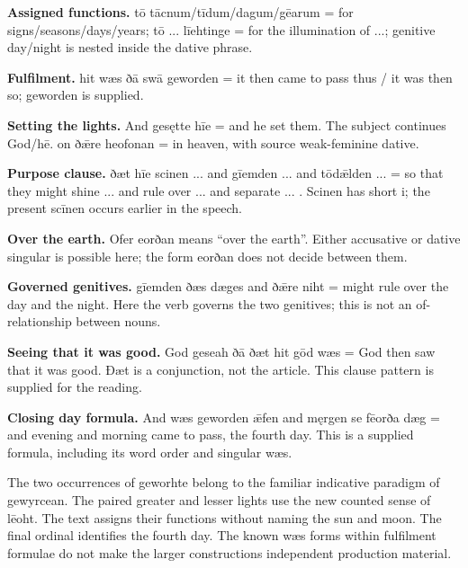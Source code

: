 \textbf{Assigned functions.} tō tācnum/\allowbreak{}tīdum/\allowbreak{}dagum/\allowbreak{}gēarum = for signs/\allowbreak{}seasons/\allowbreak{}days/\allowbreak{}years; tō ... līehtinge = for the illumination of ...; genitive day/\allowbreak{}night is nested inside the dative phrase.

\textbf{Fulfilment.} hit wæs ðā swā geworden = it then came to pass thus /\allowbreak{} it was then so; geworden is supplied.

\textbf{Setting the lights.} And gesętte hīe = and he set them. The subject continues God/\allowbreak{}hē. on ðǣre heofonan = in heaven, with source weak-feminine dative.

\textbf{Purpose clause.} ðæt hīe scinen ... and gīemden ... and tōdǣlden ... = so that they might shine ... and rule over ... and separate ... . Scinen has short i; the present scīnen occurs earlier in the speech.

\textbf{Over the earth.} Ofer eorðan means “over the earth”. Either accusative or dative singular is possible here; the form eorðan does not decide between them.

\textbf{Governed genitives.} gīemden ðæs dæges and ðǣre niht = might rule over the day and the night. Here the verb governs the two genitives; this is not an of-relationship between nouns.

\textbf{Seeing that it was good.} God geseah ðā ðæt hit gōd wæs = God then saw that it was good. Ðæt is a conjunction, not the article. This clause pattern is supplied for the reading.

\textbf{Closing day formula.} And wæs geworden ǣfen and męrgen se fēorða dæg = and evening and morning came to pass, the fourth day. This is a supplied formula, including its word order and singular wæs.

The two occurrences of geworhte belong to the familiar indicative paradigm of gewyrcean. The paired greater and lesser lights use the new counted sense of lēoht. The text assigns their functions without naming the sun and moon. The final ordinal identifies the fourth day. The known wæs forms within fulfilment formulae do not make the larger constructions independent production material.

